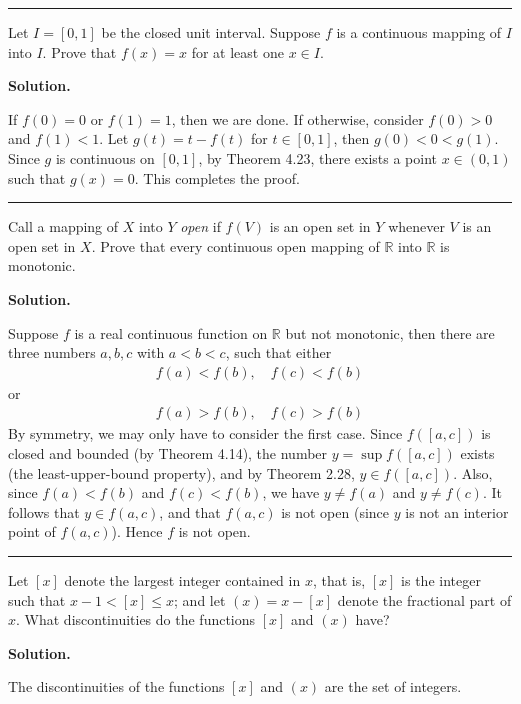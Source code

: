\documentclass[12pt]{article}
\theoremstyle{definition}
\begin{document}
\bigskip\noindent\hrule\bigskip

Let $I=[0,1]$ be the closed unit interval. Suppose $f$ is a continuous mapping of $I$ into $I$. Prove that $f(x)=x$ for at least one $x\in I$.

\smallskip
\noindent\textbf{Solution.}\quad

If $f(0)=0$ or $f(1)=1$, then we are done. If otherwise, consider $f(0)>0$ and $f(1)<1$. Let $g(t)=t-f(t)$ for $t\in[0,1]$, then $g(0)<0<g(1)$. Since $g$ is continuous on $[0,1]$, by Theorem 4.23, there exists a point $x\in(0,1)$ such that $g(x)=0$. This completes the proof.



\bigskip\noindent\hrule\bigskip

Call a mapping of $X$ into $Y$ \textit{open} if $f(V)$ is an open set in $Y$ whenever $V$ is an open set in $X$.
Prove that every continuous open mapping of $\mathbb{R}$ into $\mathbb{R}$ is monotonic.

\smallskip
\noindent\textbf{Solution.}\quad

Suppose $f$ is a real continuous function on $\mathbb{R}$ but not monotonic, then there are three numbers $a,b,c$ with $a<b<c$, such that either
\begin{align*}
f(a)<f(b),\quad f(c)<f(b)
\end{align*}
or
\begin{align*}
f(a)>f(b),\quad f(c)>f(b)
\end{align*}
By symmetry, we may only have to consider the first case. Since $f([a,c])$ is closed and bounded (by Theorem 4.14), the number $y=\sup f([a,c])$ exists (the least-upper-bound property), and by Theorem 2.28, $y\in f([a,c])$. Also, since $f(a)<f(b)$ and $f(c)<f(b)$, we have $y\ne f(a)$ and $y\ne f(c)$. It follows that $y\in f(a,c)$, and that $f(a,c)$ is not open (since $y$ is not an interior point of $f(a,c)$). Hence $f$ is not open.



\bigskip\noindent\hrule\bigskip

Let $[x]$ denote the largest integer contained in $x$, that is, $[x]$ is the integer such that $x-1<[x]\le x$; and let $(x)=x-[x]$ denote the fractional part of $x$. What discontinuities do the functions $[x]$ and $(x)$ have?

\smallskip
\noindent\textbf{Solution.}\quad

The discontinuities of the functions $[x]$ and $(x)$ are the set of integers.
\end{document}
